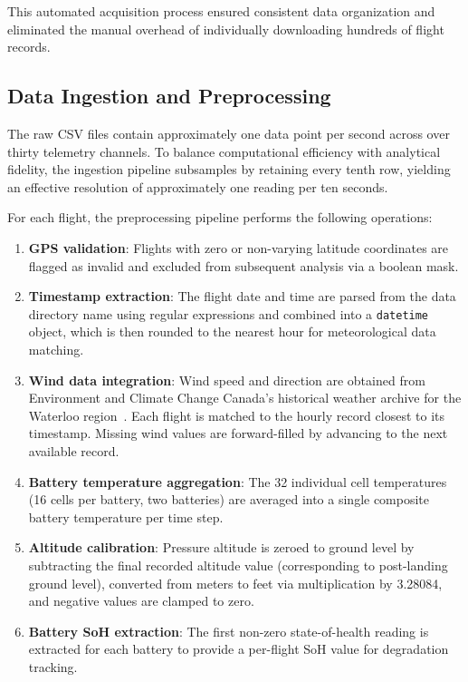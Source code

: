 \documentclass[11pt,a4paper]{article}
\begin{document}
This automated acquisition process ensured consistent data organization and eliminated the manual overhead of individually downloading hundreds of flight records.

\subsection{Data Ingestion and Preprocessing}

The raw CSV files contain approximately one data point per second across over thirty telemetry channels.
To balance computational efficiency with analytical fidelity, the ingestion pipeline subsamples by retaining every tenth row, yielding an effective resolution of approximately one reading per ten seconds.

For each flight, the preprocessing pipeline performs the following operations:

\begin{enumerate}
    \item \textbf{GPS validation}: Flights with zero or non-varying latitude coordinates are flagged as invalid and excluded from subsequent analysis via a boolean mask.
    \item \textbf{Timestamp extraction}: The flight date and time are parsed from the data directory name using regular expressions and combined into a \texttt{datetime} object, which is then rounded to the nearest hour for meteorological data matching.
    \item \textbf{Wind data integration}: Wind speed and direction are obtained from Environment and Climate Change Canada's historical weather archive for the Waterloo region~\cite{eccc}. Each flight is matched to the hourly record closest to its timestamp. Missing wind values are forward-filled by advancing to the next available record.
    \item \textbf{Battery temperature aggregation}: The 32 individual cell temperatures (16 cells per battery, two batteries) are averaged into a single composite battery temperature per time step.
    \item \textbf{Altitude calibration}: Pressure altitude is zeroed to ground level by subtracting the final recorded altitude value (corresponding to post-landing ground level), converted from meters to feet via multiplication by 3.28084, and negative values are clamped to zero.
    \item \textbf{Battery SoH extraction}: The first non-zero state-of-health reading is extracted for each battery to provide a per-flight SoH value for degradation tracking.
\end{enumerate}
\end{document}
